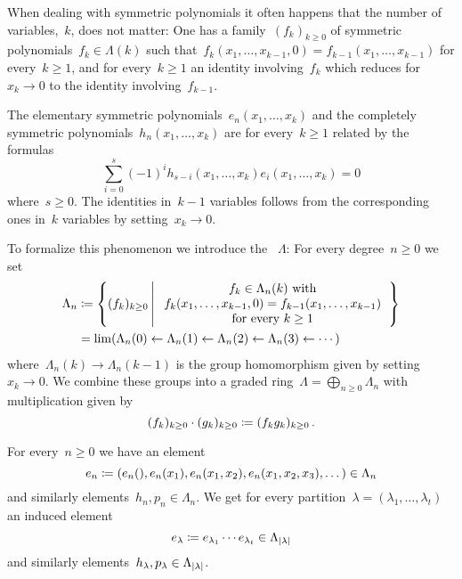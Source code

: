 \documentclass[a4paper,10pt]{scrartcl}
\begin{document}
When dealing with symmetric polynomials it often happens that the number of variables,~$k$, does not matter:
One has a family~$(f_k)_{k \geq 0}$ of symmetric polynomials~$f_k \in \Lambda(k)$ such that~$f_k(x_1, \dotsc, x_{k-1}, 0) = f_{k-1}(x_1, \dotsc, x_{k-1})$ for every~$k \geq 1$, and for every~$k \geq 1$ an identity involving~$f_k$ which reduces for~$x_k \to 0$ to the identity involving~$f_{k-1}$.

\begin{example}
  The elementary symmetric polynomials~$e_n(x_1, \dotsc, x_k)$ and the completely symmetric polynomials~$h_n(x_1, \dotsc, x_k)$ are for every~$k \geq 1$ related by the formulas
  \[
    \sum_{i=0}^s (-1)^i h_{s-i}(x_1, \dotsc, x_k) e_i(x_1, \dotsc, x_k) = 0
  \]
  where~$s \geq 0$.
  The identities in~$k-1$ variables follows from the corresponding ones in~$k$ variables by setting~$x_k \to 0$.
\end{example}

To formalize this phenomenon we introduce the ~$\Lambda$:
For every degree~$n \geq 0$ we set
\begin{align*}
  \Lambda_n
  &\defined
  \left\{
    (f_k)_{k \geq 0}
  \suchthat*
    \begin{tabular}{c}
      $f_k \in \Lambda_n(k)$ with \\
      $f_k(x_1, \dotsc, x_{k-1}, 0) = f_{k-1}(x_1, \dotsc, x_{k-1})$ \\
      for every~$k \geq 1$
    \end{tabular}
  \right\}
  \\
  &=
  \lim( \Lambda_n(0) \from \Lambda_n(1) \from \Lambda_n(2) \from \Lambda_n(3) \from \dotsb)
\end{align*}
where~$\Lambda_n(k) \to \Lambda_n(k-1)$ is the group homomorphism given by setting  ~$x_k \to 0$.
We combine these groups into a graded ring~$\Lambda = \bigoplus_{n \geq 0} \Lambda_n$ with multiplication given by
\[
  (f_k)_{k \geq 0} \cdot (g_k)_{k \geq 0}
  \coloneqq
  (f_k g_k)_{k \geq 0} \,.
\]

\begin{example}
  For every~$n \geq 0$ we have an element
  \[
    e_n
    \coloneqq
    (e_n(), e_n(x_1), e_n(x_1, x_2), e_n(x_1, x_2, x_3), \dotsc)
    \in
    \Lambda_n
  \]
  and similarly elements~$h_n, p_n \in \Lambda_n$.
  We get for every partition~$\lambda = (\lambda_1, \dotsc, \lambda_t)$ an induced element
  \[
    e_{\lambda}
    \coloneqq
    e_{\lambda_1} \dotsm e_{\lambda_t}
    \in
    \Lambda_{\lvert\lambda\rvert}
  \]
  and similarly elements~$h_{\lambda}, p_{\lambda} \in \Lambda_{\lvert\lambda\rvert}$.
\end{example}
\end{document}
